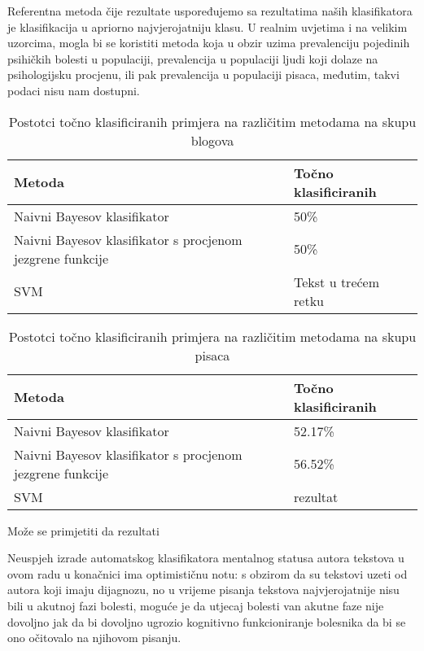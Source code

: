 \documentclass[10pt, a4paper]{article}
\begin{document}
Referentna metoda čije rezultate uspoređujemo sa rezultatima naših klasifikatora je klasifikacija u apriorno najvjerojatniju klasu. U realnim uvjetima i na velikim uzorcima, mogla bi se koristiti metoda koja u obzir uzima prevalenciju pojedinih psihičkih bolesti u populaciji, prevalencija u populaciji ljudi koji dolaze na psihologijsku procjenu, ili pak prevalencija u populaciji pisaca, međutim, takvi podaci nisu nam dostupni.

\begin{table*}
\caption{Postotci točno klasificiranih primjera na različitim metodama na skupu blogova}
\label{tab:rezultati}
\begin{center}
\begin{tabular}{ll}
\toprule
Metoda & Točno klasificiranih \\
\midrule
Naivni Bayesov klasifikator & 50\%\\
Naivni Bayesov klasifikator s procjenom jezgrene funkcije   & 50\%\\
SVM   & Tekst u trećem retku\\
\bottomrule
\end{tabular}
\end{center}
\end{table*}
\begin{table*}
\caption{Postotci točno klasificiranih primjera na različitim metodama na skupu pisaca}
\begin{center}
\begin{tabular}{ll}
\toprule
Metoda & Točno klasificiranih\\
\midrule
Naivni Bayesov klasifikator & 52.17\%\\
Naivni Bayesov klasifikator s procjenom jezgrene funkcije & 56.52\%\\
SVM & rezultat\\
\bottomrule
\end{tabular}
\end{center}
\end{table*}

Može se primjetiti da rezultati 

Neuspjeh izrade automatskog klasifikatora mentalnog statusa autora tekstova u ovom radu u konačnici ima optimističnu notu: s obzirom da su tekstovi uzeti od autora koji imaju dijagnozu, no u vrijeme pisanja tekstova najvjerojatnije nisu bili u akutnoj fazi bolesti, moguće je da utjecaj bolesti van akutne faze nije dovoljno jak da bi dovoljno ugrozio kognitivno funkcioniranje bolesnika da bi se ono očitovalo na njihovom pisanju. 
\end{document}
